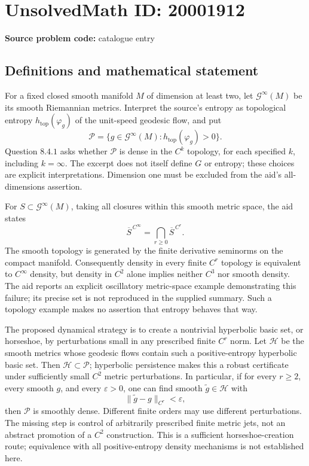 \documentclass[11pt]{article}
\newcommand{\eps}{\varepsilon}
\begin{document}
\section*{UnsolvedMath ID: 20001912}
\textbf{Source problem code:} catalogue entry
\subsection{Definitions and mathematical statement}
For a fixed closed smooth manifold \(M\) of dimension at least two, let \(\mathcal G^\infty(M)\) be its smooth Riemannian metrics. Interpret the source's entropy as topological entropy \(h_{\mathrm{top}}(\varphi_g)\) of the unit-speed geodesic flow, and put
\[
 \mathcal P=\{g\in\mathcal G^\infty(M):h_{\mathrm{top}}(\varphi_g)>0\}.
\]
Question \(8.4.1\) asks whether \(\mathcal P\) is dense in the \(C^k\) topology, for each specified \(k\), including \(k=\infty\). The excerpt does not itself define \(G\) or entropy; these choices are explicit interpretations. Dimension one must be excluded from the aid's all-dimensions assertion.

For \(S\subset\mathcal G^\infty(M)\), taking all closures within this smooth metric space, the aid states
\[
 \overline S^{\,C^\infty}=\bigcap_{r\geq0}\overline S^{\,C^r}.
\]
The smooth topology is generated by the finite derivative seminorms on the compact manifold. Consequently density in every finite \(C^r\) topology is equivalent to \(C^\infty\) density, but density in \(C^2\) alone implies neither \(C^3\) nor smooth density. The aid reports an explicit oscillatory metric-space example demonstrating this failure; its precise set is not reproduced in the supplied summary. Such a topology example makes no assertion that entropy behaves that way.

The proposed dynamical strategy is to create a nontrivial hyperbolic basic set, or horseshoe, by perturbations small in any prescribed finite \(C^r\) norm. Let \(\mathcal H\) be the smooth metrics whose geodesic flows contain such a positive-entropy hyperbolic basic set. Then \(\mathcal H\subset\mathcal P\); hyperbolic persistence makes this a robust certificate under sufficiently small \(C^2\) metric perturbations. In particular, if for every \(r\geq2\), every smooth \(g\), and every \(\eps>0\), one can find smooth \(\widetilde g\in\mathcal H\) with
\[
 \|\widetilde g-g\|_{C^r}<\eps,
\]
then \(\mathcal P\) is smoothly dense. Different finite orders may use different perturbations. The missing step is control of arbitrarily prescribed finite metric jets, not an abstract promotion of a \(C^2\) construction. This is a sufficient horseshoe-creation route; equivalence with all positive-entropy density mechanisms is not established here.
\end{document}
